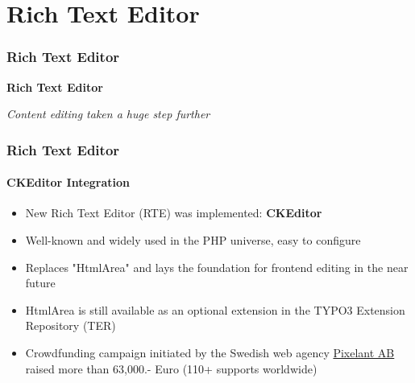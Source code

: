 %

\section{Rich Text Editor}
\begin{frame}[fragile]
	\frametitle{Rich Text Editor}

	\begin{center}\huge{\color{typo3darkgrey}\textbf{Rich Text Editor}}\end{center}
	\begin{center}\large{\textit{Content editing taken a huge step further}}\end{center}

\end{frame}

\begin{frame}[fragile]
	\frametitle{Rich Text Editor}
	\framesubtitle{CKEditor Integration}

	\begin{itemize}

		\item New Rich Text Editor (RTE) was implemented: \textbf{CKEditor}
		\item Well-known and widely used in the PHP universe, easy to configure
		\item Replaces "HtmlArea" and lays the foundation for frontend editing in the near future
		\item HtmlArea is still available as an optional extension in the TYPO3 Extension Repository (TER)

		\item Crowdfunding campaign initiated by the Swedish web agency
			\href{http://pixelant.net}{Pixelant AB} raised more than
			63,000.- Euro (110+ supports worldwide)

	\end{itemize}

\end{frame}

